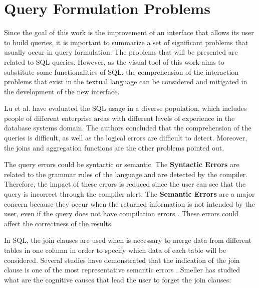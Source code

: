 \section{Query Formulation Problems}
\label{sec:query_formulation_problems}
Since the goal of this work is the improvement of an interface that allows its user to build queries, it is important to summarize a set of significant problems that usually occur in query formulation. The problems that will be presented are related to \gls{SQL} queries. However, as the visual tool of this work aims to substitute some functionalities of \gls{SQL}, the comprehension of the interaction problems that exist in the textual language can be considered and mitigated in the development of the new interface. 

Lu et al. \cite{aSurveyOnUsageOfSQL} have evaluated the \gls{SQL} usage in a diverse population, which includes people of different enterprise areas with different levels of experience in the database systems domain. The authors concluded that the comprehension of the queries is difficult, as well as the logical errors are difficult to detect. Moreover, the joins and aggregation functions are the other problems pointed out.

The query errors could be syntactic or semantic. The \textbf{Syntactic Errors} are related to the grammar rules of the language and are detected by the compiler. Therefore, the impact of these errors is reduced since the user can see that the query is incorrect through the compiler alert. The \textbf{Semantic Errors} are a major concern because they occur when the returned information is not intended by the user, even if the query does not have compilation errors \cite{userErrorsInDatabaseQueryComposition}. These errors could affect the correctness of the results.

In \gls{SQL}, the join clauses are used when is necessary to merge data from different tables in one column in order to specify which data of each table will be considered. Several studies have demonstrated that the indication of the join clause is one of the most representative semantic errors \cite{studentsSemanticMistakesInWritingSevenDifferentTypesOfSQLQueries,aSurveyOnUsageOfSQL}. Smeller \cite{userErrorsInDatabaseQueryComposition} has studied what are the cognitive causes that lead the user to forget the join clauses:

